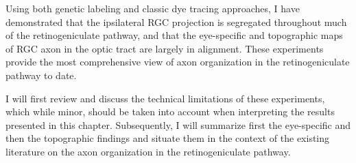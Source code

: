 Using both genetic labeling and classic dye tracing approaches, I have demonstrated that the ipsilateral RGC projection is segregated throughout much of the retinogeniculate pathway, and that the eye-specific and topographic maps of RGC axon in the optic tract are largely in alignment.
These experiments provide the most comprehensive view of axon organization in the retinogeniculate pathway to date.

I will first review and discuss the technical limitations of these experiments, which while minor, should be taken into account when interpreting the results presented in this chapter.
Subsequently, I will summarize first the eye-specific and then the topographic findings and situate them in the context of the existing literature on the axon organization in the retinogeniculate pathway.